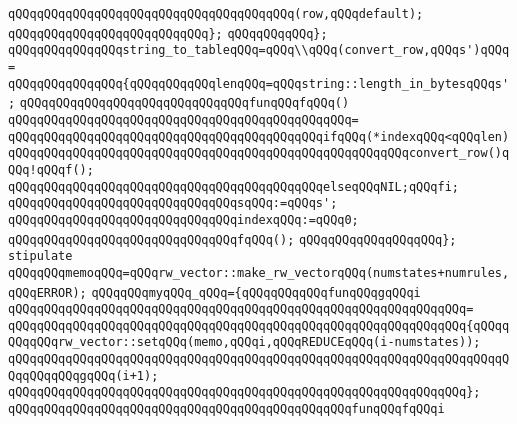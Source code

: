 \verb|qQQqqQQqqQQqqQQqqQQqqQQqqQQqqQQqqQQqqQQq(row,qQQqdefault);|\newline
\verb|qQQqqQQqqQQqqQQqqQQqqQQqqQQq};|\newline
\verb|qQQqqQQqqQQq};|\newline
\newline
\verb|qQQqqQQqqQQqqQQqstring_to_tableqQQq=qQQq\\qQQq(convert_row,qQQqs')qQQq=|\newline
\verb|qQQqqQQqqQQqqQQq{qQQqqQQqqQQqlenqQQq=qQQqstring::length_in_bytesqQQqs';|\newline
\verb|qQQqqQQqqQQqqQQqqQQqqQQqqQQqqQQqfunqQQqfqQQq()|\newline
\verb|qQQqqQQqqQQqqQQqqQQqqQQqqQQqqQQqqQQqqQQqqQQqqQQq=|\newline
\verb|qQQqqQQqqQQqqQQqqQQqqQQqqQQqqQQqqQQqqQQqqQQqifqQQq(*indexqQQq<qQQqlen)|\newline
\verb|qQQqqQQqqQQqqQQqqQQqqQQqqQQqqQQqqQQqqQQqqQQqqQQqqQQqqQQqconvert_row()qQQq!qQQqf();|\newline
\verb|qQQqqQQqqQQqqQQqqQQqqQQqqQQqqQQqqQQqqQQqqQQqelseqQQqNIL;qQQqfi;|\newline
\verb|qQQqqQQqqQQqqQQqqQQqqQQqqQQqqQQqsqQQq:=qQQqs';|\newline
\verb|qQQqqQQqqQQqqQQqqQQqqQQqqQQqqQQqindexqQQq:=qQQq0;|\newline
\verb|qQQqqQQqqQQqqQQqqQQqqQQqqQQqqQQqfqQQq();|\newline
\verb|qQQqqQQqqQQqqQQqqQQq};|\newline
\newline
\verb|stipulate|\newline
\verb|qQQqqQQqmemoqQQq=qQQqrw_vector::make_rw_vectorqQQq(numstates+numrules,qQQqERROR);|\newline
\verb|qQQqqQQqmyqQQq_qQQq={qQQqqQQqqQQqfunqQQqgqQQqi|\newline
\verb|qQQqqQQqqQQqqQQqqQQqqQQqqQQqqQQqqQQqqQQqqQQqqQQqqQQqqQQqqQQqqQQq=|\newline
\verb|qQQqqQQqqQQqqQQqqQQqqQQqqQQqqQQqqQQqqQQqqQQqqQQqqQQqqQQqqQQqqQQq{qQQqqQQqqQQqrw_vector::setqQQq(memo,qQQqi,qQQqREDUCEqQQq(i-numstates));|\newline
\verb|qQQqqQQqqQQqqQQqqQQqqQQqqQQqqQQqqQQqqQQqqQQqqQQqqQQqqQQqqQQqqQQqqQQqqQQqqQQqqQQqgqQQq(i+1);|\newline
\verb|qQQqqQQqqQQqqQQqqQQqqQQqqQQqqQQqqQQqqQQqqQQqqQQqqQQqqQQqqQQqqQQq};|\newline
\newline
\verb|qQQqqQQqqQQqqQQqqQQqqQQqqQQqqQQqqQQqqQQqqQQqqQQqfunqQQqfqQQqi|\newline
